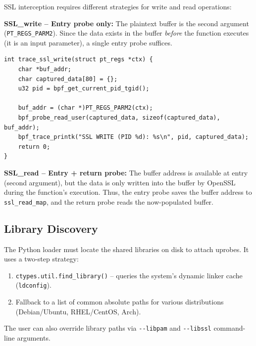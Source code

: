 \documentclass[11pt,a4paper]{article}
\begin{document}
SSL interception requires different strategies for write and read operations:

\textbf{SSL\_write -- Entry probe only:}
The plaintext buffer is the second argument (\texttt{PT\_REGS\_PARM2}). Since
the data exists in the buffer \textit{before} the function executes (it is an
input parameter), a single entry probe suffices.

\begin{lstlisting}[style=cstyle, caption={SSL\_write entry probe}, label={lst:ssl_write}]
int trace_ssl_write(struct pt_regs *ctx) {
    char *buf_addr;
    char captured_data[80] = {};
    u32 pid = bpf_get_current_pid_tgid();

    buf_addr = (char *)PT_REGS_PARM2(ctx);
    bpf_probe_read_user(captured_data, sizeof(captured_data), buf_addr);
    bpf_trace_printk("SSL WRITE (PID %d): %s\n", pid, captured_data);
    return 0;
}
\end{lstlisting}

\textbf{SSL\_read -- Entry + return probe:}
The buffer address is available at entry (second argument), but the data is
only written into the buffer by OpenSSL during the function's execution. Thus,
the entry probe saves the buffer address to \texttt{ssl\_read\_map}, and the
return probe reads the now-populated buffer.

\subsection{Library Discovery}
\label{subsec:discovery}

The Python loader must locate the shared libraries on disk to attach uprobes.
It uses a two-step strategy:

\begin{enumerate}
    \item \texttt{ctypes.util.find\_library()} -- queries the system's dynamic
          linker cache (\texttt{ldconfig}).
    \item Fallback to a list of common absolute paths for various distributions
          (Debian/Ubuntu, RHEL/CentOS, Arch).
\end{enumerate}

The user can also override library paths via \texttt{-{}-libpam} and
\texttt{-{}-libssl} command-line arguments.


\end{document}
